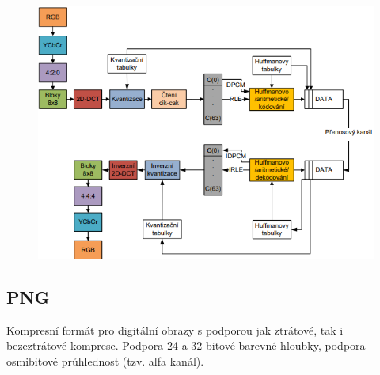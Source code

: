 \begin{figure}[ht]
    \centering
    \includegraphics[width=0.65\linewidth]{images/jpeg.png}
\end{figure}
\FloatBarrier

\subsection{PNG}

Kompresní formát pro digitální obrazy s podporou jak ztrátové, tak i bezeztrátové komprese. Podpora 24 a 32 bitové barevné hloubky, podpora osmibitové průhlednost (tzv. alfa kanál).

